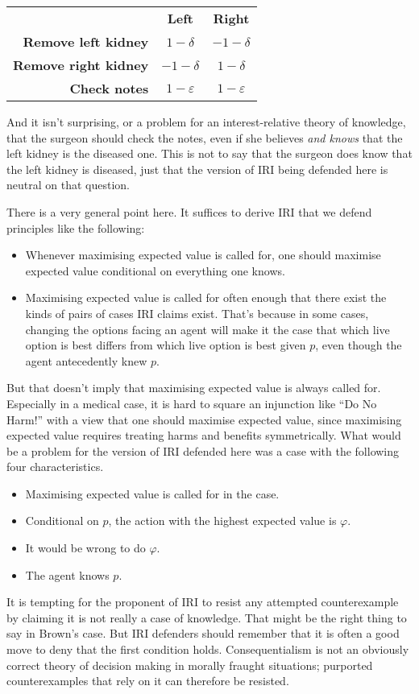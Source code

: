 \begin{center}
\begin{tabular}{r c c}
 & \textbf{Left} & \textbf{Right} \\
\textbf{Remove left kidney} & $1-\delta$ & $-1-\delta$ \\
\textbf{Remove right kidney} & $-1-\delta$ & $1-\delta$ \\
\textbf{Check notes} & $1-\varepsilon$ & $1-\varepsilon$ \\
\end{tabular}
\end{center}

\noindent And it isn't surprising, or a problem for an interest-relative theory of knowledge, that the surgeon should check the notes, even if she believes \textit{and knows} that the left kidney is the diseased one. This is not to say that the surgeon does know that the left kidney is diseased, just that the version of IRI being defended here is neutral on that question.

There is a very general point here. It suffices to derive IRI that we defend principles like the following:

\begin{itemize}
\item Whenever maximising expected value is called for, one should maximise expected value conditional on everything one knows.
\item Maximising expected value is called for often enough that there exist the kinds of pairs of cases IRI claims exist. That's because in some cases, changing the options facing an agent will make it the case that which live option is best differs from which live option is best given $p$, even though the agent antecedently knew $p$.
\end{itemize}

\noindent But that doesn't imply that maximising expected value is always called for. Especially in a medical case, it is hard to square an injunction like ``Do No Harm!'' with a view that one should maximise expected value, since maximising expected value requires treating harms and benefits symmetrically. What would be a problem for the version of IRI defended here was a case with the following four characteristics.

\begin{itemize}
\item Maximising expected value is called for in the case.
\item Conditional on $p$, the action with the highest expected value is $\varphi$.
\item It would be wrong to do $\varphi$.
\item The agent knows $p$.
\end{itemize}

\noindent It is tempting for the proponent of IRI to resist any attempted counterexample by claiming it is not really a case of knowledge. That might be the right thing to say in Brown's case. But IRI defenders should remember that it is often a good move to deny that the first condition holds. Consequentialism is not an obviously correct theory of decision making in morally fraught situations; purported counterexamples that rely on it can therefore be resisted.